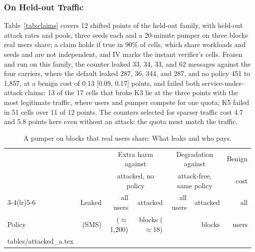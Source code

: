 \documentclass{IEEEoj}
\makeatletter
\newcommand{\tablerows}[1]{\@@input #1 }         %
\makeatother
\begin{document}
\subsubsection{On Held-out Traffic}
Table~\ref{tab:claims} covers 12 shifted points of the held-out family, with held-out attack rates and pools, three seeds each and a 20-minute pumper on three blocks real users share; a claim holds if true in 90\% of cells, which share workloads and seeds and are not independent, and IV marks the instant verifier's cells. Frozen and run on this family, the counter leaked 33, 34, 33, and 62 messages against the four carriers, where the default leaked 287, 36, 344, and 287, and no policy 451 to 1,857, at a benign cost of 0.13 [0.09, 0.17] points, and failed both service-under-attack claims: 13 of the 17 cells that broke K3 lie at the three points with the most legitimate traffic, where users and pumper compete for one quota; K5 failed in 51 cells over 11 of 12 points. The counters selected for sparser traffic cost 4.7 and 5.8 points here even without an attack: the quota must match the traffic.

\begin{table}[!t]
\caption{A pumper on blocks that real users share: What leaks and who pays.}
\label{tab:attacked}
\footnotesize
\begin{tabular*}{\textwidth}{@{\extracolsep{\fill}}lrrrrrr@{}}
\toprule
 & & \multicolumn{2}{c}{Extra harm against} & \multicolumn{2}{c}{Degradation against} & Benign \\
 & & \multicolumn{2}{c}{attacked, no policy} & \multicolumn{2}{c}{attack-free, same policy} & cost \\
\cmidrule(lr){3-4}\cmidrule(lr){5-6}
 & Leaked & all users & attacked & all users & attacked & all \\
Policy & (SMS) & ($\approx$1,200) & blocks ($\approx$18) & & blocks & users \\
\midrule
\tablerows{tables/attacked_a.tex}
\bottomrule
\end{tabular*}
\end{table}
\end{document}
